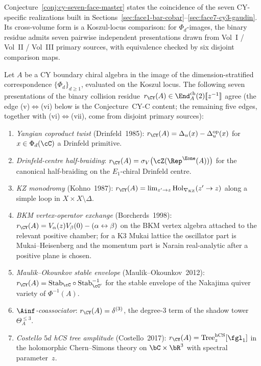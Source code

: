 Conjecture~\ref{conj:cy-seven-face-master} states the coincidence of
the seven CY-specific realizations built in
Sections~\ref{sec:face1-bar-cobar}--\ref{sec:face7-cy3-gaudin}. Its
cross-volume form is a Koszul-locus comparison: for $\Phi_d$-images,
the binary residue admits seven pairwise independent presentations
drawn from Vol~I / Vol~II / Vol~III primary sources, with equivalence
checked by six disjoint comparison maps.

\begin{conjecture}[Cross-volume seven-face agreement for \texorpdfstring{$r_{\CY}$}{r-CY},
modulo CY-C at edge (v)\texorpdfstring{$\Leftrightarrow$}{<=>}(vi)]
\label{thm:seven-faces-of-r-cy}
\ClaimStatusConjectured
Let $A$ be a CY boundary chiral algebra in the image of the
dimension-stratified correspondence $\{\Phi_d\}_{d \ge 1}$, evaluated
on the Koszul locus. The following seven presentations of the binary
collision residue~$r_{\CY}(A) \in \End^{\mathrm{ch}}_A(2)[\![z^{-1}]\!]$
agree (the edge (v)$\Leftrightarrow$(vi) below is the Conjecture~CY-C
content; the remaining five edges, together with (vi)$\Leftrightarrow$(vii),
come from disjoint primary sources):
\begin{enumerate}[label=\textup{(\roman*)},leftmargin=2.4em]
\item \emph{Yangian coproduct twist} (Drinfeld~1985):
$r_{\CY}(A) = \Delta_u(x) - \Delta_u^{\mathrm{op}}(x)$
for $x \in \Phi_d(\cC)$ a Drinfeld primitive.
\item \emph{Drinfeld-centre half-braiding}:
$r_{\CY}(A) = \sigma_V\bigl(\cZ(\Rep^{\Eone}(A))\bigr)$
for the canonical half-braiding on the $E_1$-chiral Drinfeld centre.
\item \emph{KZ monodromy} (Kohno~1987):
$r_{\CY}(A) = \lim_{z' \to z}\mathrm{Hol}_{\nabla_{\mathrm{KZ}}}(z' \to z)$
along a simple loop in $X \times X \setminus \Delta$.
\item \emph{BKM vertex-operator exchange} (Borcherds~1998):
$r_{\CY}(A) = V_\alpha(z)V_\beta(0) - (\alpha \leftrightarrow \beta)$
on the BKM vertex algebra attached to the relevant positive chamber;
for a K3 Mukai lattice the oscillator part is Mukai--Heisenberg and the
momentum part is Narain real-analytic after a positive plane is chosen.
\item \emph{Maulik--Okounkov stable envelope} (Maulik--Okounkov~2012):
$r_{\CY}(A) = \mathrm{Stab}_\cC \circ \mathrm{Stab}_{\cC'}^{-1}$
for the stable envelope of the Nakajima quiver variety of $\Phi^{-1}(A)$.
\item \emph{$\Ainf$-coassociator}:
$r_{\CY}(A) = \delta^{(3)}$, the degree-$3$ term of the shadow tower
$\Theta_A^{\le 3}$.
\item \emph{Costello $5d$ hCS tree amplitude} (Costello~2017):
$r_{\CY}(A) = \mathrm{Tree}^{\mathrm{hCS}}_z[\fgl_1]$
in the holomorphic Chern--Simons theory on $\bC \times \bR^3$ with
spectral parameter~$z$.
\end{enumerate}
\end{conjecture}

